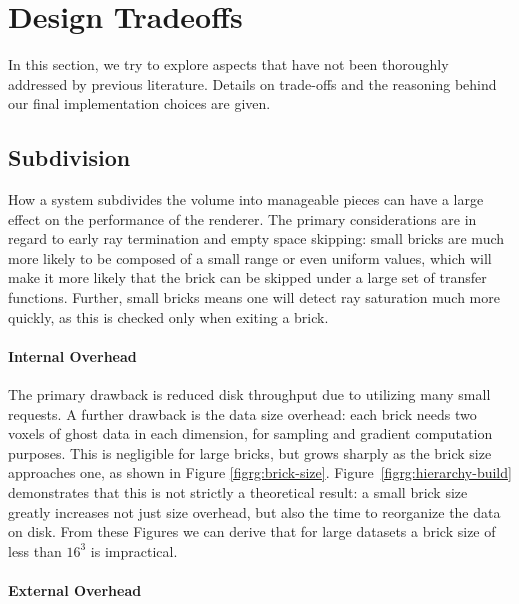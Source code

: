 \section{Design Tradeoffs}
\label{sec:tradeoffs}

In this section, we try to explore aspects that have not been
thoroughly addressed by previous literature.  Details on trade-offs and
the reasoning behind our final implementation choices are given.


\subsection{Subdivision}
\label{sec:subdivision}

How a system subdivides the volume into manageable pieces can have
a large effect on the performance of the renderer.  The primary
considerations are in regard to early ray termination and empty space
skipping: small bricks are much more likely to be composed of a small
range or even uniform values, which will make it more likely that the
brick can be skipped under a large set of transfer functions.  Further,
small bricks means one will detect ray saturation much more quickly, as
this is checked only when exiting a brick.

\paragraph{Internal Overhead}

The primary drawback is reduced disk throughput due to utilizing many
small requests.  A further drawback is the data size overhead: each
brick needs two voxels of ghost data in each dimension, for sampling
and gradient computation purposes.  This is negligible for large
bricks, but grows sharply as the brick size approaches one, as shown in
Figure
\ref{figrg:brick-size}. Figure~\ref{figrg:hierarchy-build} demonstrates
that this is not strictly a theoretical result: a small brick size
greatly increases not just size overhead, but also the time to
reorganize the data on disk.  From these Figures we can derive that for
large datasets a brick size of less than $16^3$ is impractical.

\paragraph{External Overhead}

